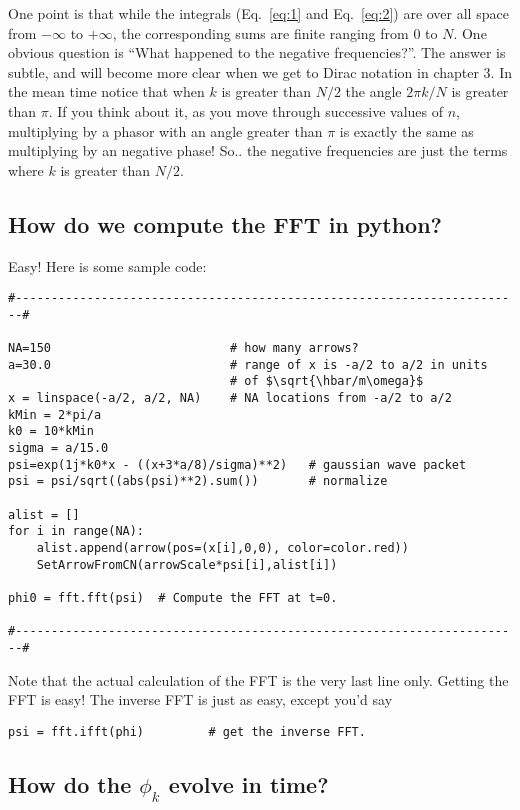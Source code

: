 \documentclass[11pt]{article} %
\begin{document}
One point is that while the integrals (Eq.~\ref{eq:1} and Eq.~\ref{eq:2}) are over all space from $-\infty$ to $+\infty$, the corresponding sums are finite ranging from $0$ to $N$. One obvious question is ``What happened to the negative frequencies?''. The answer is subtle, and will become more clear when we get to Dirac notation in chapter 3. In the mean time notice that when $k$ is greater than $N/2$ the angle $2\pi k/N$ is greater than $\pi$. If you think about it, as you move through successive values of $n$, multiplying by a phasor with an angle greater than $\pi$ is exactly the same as multiplying by an negative phase! So.. the negative frequencies are just the terms where $k$ is greater than $N/2$.

\subsection*{How do we compute the FFT in python?}

Easy! Here is some sample code:

\begin{verbatim}
#-----------------------------------------------------------------------#

NA=150                         # how many arrows?
a=30.0                         # range of x is -a/2 to a/2 in units 
                               # of $\sqrt{\hbar/m\omega}$
x = linspace(-a/2, a/2, NA)    # NA locations from -a/2 to a/2
kMin = 2*pi/a
k0 = 10*kMin
sigma = a/15.0
psi=exp(1j*k0*x - ((x+3*a/8)/sigma)**2)   # gaussian wave packet
psi = psi/sqrt((abs(psi)**2).sum())       # normalize

alist = []
for i in range(NA):
    alist.append(arrow(pos=(x[i],0,0), color=color.red))
    SetArrowFromCN(arrowScale*psi[i],alist[i])
    
phi0 = fft.fft(psi)  # Compute the FFT at t=0.

#-----------------------------------------------------------------------#
\end{verbatim}

Note that the actual calculation of the FFT is the very last line only. Getting the FFT is easy! The inverse FFT is just as easy, except you'd say

\begin{verbatim}
psi = fft.ifft(phi)         # get the inverse FFT.
\end{verbatim}


\subsection*{How do the $\phi_k$ evolve in time?}
\end{document}
